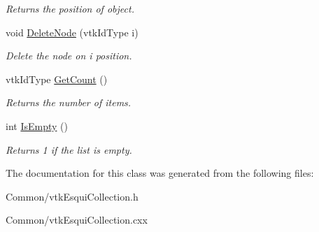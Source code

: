 \begin{DoxyCompactItemize}
\begin{DoxyCompactList}\small\item\em Returns the position of object. \item\end{DoxyCompactList}\item 
\hypertarget{classvtkEsquiCollection_ac6efed45ce8a693341ca27c4b3bf5fa5}{
void \hyperlink{classvtkEsquiCollection_ac6efed45ce8a693341ca27c4b3bf5fa5}{DeleteNode} (vtkIdType i)}
\label{classvtkEsquiCollection_ac6efed45ce8a693341ca27c4b3bf5fa5}

\begin{DoxyCompactList}\small\item\em Delete the node on i position. \item\end{DoxyCompactList}\item 
\hypertarget{classvtkEsquiCollection_af7feb6263c8f707030d18b15b9c0c098}{
vtkIdType \hyperlink{classvtkEsquiCollection_af7feb6263c8f707030d18b15b9c0c098}{GetCount} ()}
\label{classvtkEsquiCollection_af7feb6263c8f707030d18b15b9c0c098}

\begin{DoxyCompactList}\small\item\em Returns the number of items. \item\end{DoxyCompactList}\item 
\hypertarget{classvtkEsquiCollection_a05df3922f001512459c7aac40df90356}{
int \hyperlink{classvtkEsquiCollection_a05df3922f001512459c7aac40df90356}{IsEmpty} ()}
\label{classvtkEsquiCollection_a05df3922f001512459c7aac40df90356}

\begin{DoxyCompactList}\small\item\em Returns 1 if the list is empty. \item\end{DoxyCompactList}\end{DoxyCompactItemize}


The documentation for this class was generated from the following files:\begin{DoxyCompactItemize}
\item 
Common/vtkEsquiCollection.h\item 
Common/vtkEsquiCollection.cxx\end{DoxyCompactItemize}

